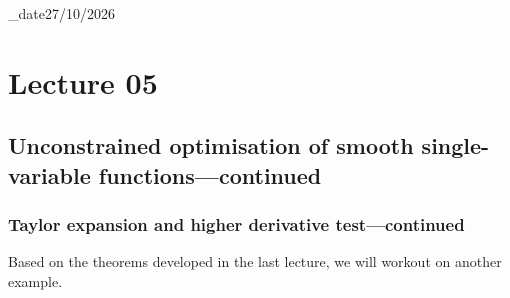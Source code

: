 \lecture_date{27/10/2026}
\chapter{Lecture 05}

\section{Unconstrained optimisation of smooth single-variable functions---continued}
\subsection{Taylor expansion and higher derivative test---continued}

Based on the theorems developed in the last lecture, we will workout on another example.

